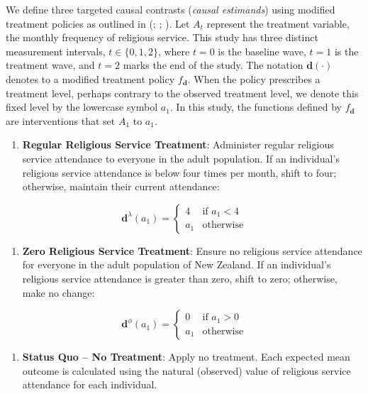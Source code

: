 \documentclass[
  single column]{article}
\providecommand{\tightlist}{%
  \setlength{\itemsep}{0pt}\setlength{\parskip}{0pt}}\usepackage{longtable,booktabs,array}
\begin{document}
We define three targeted causal contrasts (\emph{causal estimands})
using modified treatment policies as outlined in
(;
;
). Let
\(A_t\) represent the treatment variable, the monthly frequency of
religious service. This study has three distinct measurement intervals,
\(t \in \{0, 1, 2\}\), where \(t=0\) is the baseline wave, \(t=1\) is
the treatment wave, and \(t=2\) marks the end of the study. The notation
\(\mathbf{d}(\cdot)\) denotes to a modified treatment policy
\(f_\mathbf{d}\). When the policy prescribes a treatment level, perhaps
contrary to the observed treatment level, we denote this fixed level by
the lowercase symbol \(a_1\). In this study, the functions defined by
\(f_\mathbf{d}\) are interventions that set \(A_1\) to \(a_1\).

\begin{enumerate}
\def\labelenumi{\arabic{enumi}.}
\tightlist
\item
  \textbf{Regular Religious Service Treatment}: Administer regular
  religious service attendance to everyone in the adult population. If
  an individual's religious service attendance is below four times per
  month, shift to four; otherwise, maintain their current attendance:
\end{enumerate}

\[
\mathbf{d}^\lambda (a_1) = \begin{cases} 4 & \text{if } a_1 < 4 \\ 
a_1 & \text{otherwise} \end{cases}
\]

\begin{enumerate}
\def\labelenumi{\arabic{enumi}.}
\setcounter{enumi}{1}
\tightlist
\item
  \textbf{Zero Religious Service Treatment}: Ensure no religious service
  attendance for everyone in the adult population of New Zealand. If an
  individual's religious service attendance is greater than zero, shift
  to zero; otherwise, make no change:
\end{enumerate}

\[
\mathbf{d}^\phi (a_1) = \begin{cases} 0 & \text{if } a_1 > 0 \\ 
a_1 & \text{otherwise} \end{cases}
\]

\begin{enumerate}
\def\labelenumi{\arabic{enumi}.}
\setcounter{enumi}{2}
\tightlist
\item
  \textbf{Status Quo -- No Treatment}: Apply no treatment. Each expected
  mean outcome is calculated using the natural (observed) value of
  religious service attendance for each individual.
\end{enumerate}
\end{document}
